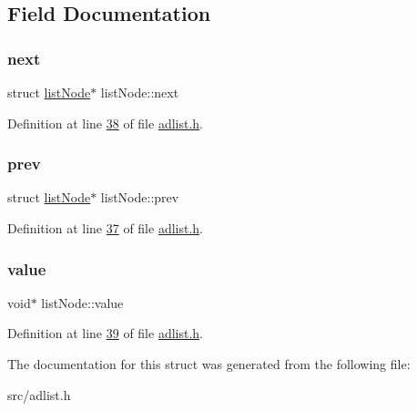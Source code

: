 \subsection{Field Documentation}
\mbox{\label{structlistNode_a860785ea27fb1c044d6a59ba491dd6ab}} 
\subsubsection{\texorpdfstring{next}{next}}
{\footnotesize\ttfamily struct \hyperlink{structlistNode}{list\+Node}$\ast$ list\+Node\+::next}



Definition at line \hyperlink{adlist_8h_source_l00038}{38} of file \hyperlink{adlist_8h_source}{adlist.\+h}.

\mbox{\label{structlistNode_a79259218e5b958028b7e650d48d3cb01}} 
\subsubsection{\texorpdfstring{prev}{prev}}
{\footnotesize\ttfamily struct \hyperlink{structlistNode}{list\+Node}$\ast$ list\+Node\+::prev}



Definition at line \hyperlink{adlist_8h_source_l00037}{37} of file \hyperlink{adlist_8h_source}{adlist.\+h}.

\mbox{\label{structlistNode_a772dfdd1352f9a568bb567d65cb7b92a}} 
\subsubsection{\texorpdfstring{value}{value}}
{\footnotesize\ttfamily void$\ast$ list\+Node\+::value}



Definition at line \hyperlink{adlist_8h_source_l00039}{39} of file \hyperlink{adlist_8h_source}{adlist.\+h}.



The documentation for this struct was generated from the following file\+:\begin{DoxyCompactItemize}
\item 
src/adlist.\+h\end{DoxyCompactItemize}
